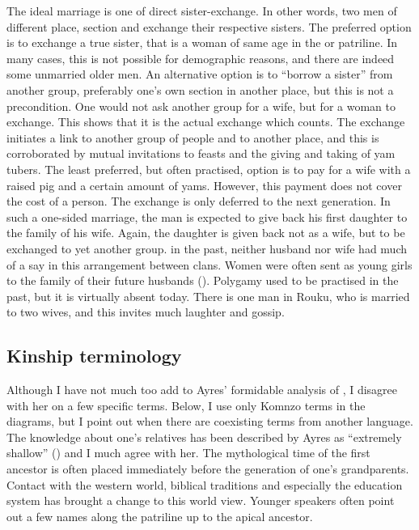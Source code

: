 The ideal marriage is one of direct sister-exchange. In other words, two men of different place, section and  exchange their respective sisters. The preferred option is to exchange a true sister, that is a woman of same age in the  or patriline. In many cases, this is not possible for demographic reasons, and there are indeed some unmarried older men. An alternative option is to ``borrow a sister'' from another group, preferably one's own section in another place, but this is not a precondition. One would not ask another group for a wife, but for a woman to exchange. This shows that it is the actual exchange which counts. The exchange initiates a link to another group of people and to another place, and this is corroborated by mutual invitations to feasts and the giving and taking of yam tubers. The least preferred, but often practised, option is to pay for a wife with a raised pig and a certain amount of yams. However, this payment does not cover the cost of a person. The exchange is only deferred to the next generation. In such a one-sided marriage, the man is expected to give back his first daughter to the family of his wife. Again, the daughter is given back not as a wife, but to be exchanged to yet another group. in the past, neither husband nor wife had much of a say in this arrangement between clans. Women were often sent as young girls to the family of their future husbands (\citealt[145]{Williams:1936transfly}). Polygamy used to be practised in the past, but it is virtually absent today. There is one man in Rouku, who is married to two wives, and this invites much laughter and gossip.

\subsection{Kinship terminology}\label{kinterms}

Although I have not much too add to Ayres' formidable analysis of , I disagree with her on a few specific terms. Below, I use only Komnzo terms in the  diagrams, but I point out when there are coexisting terms from another language. The knowledge about one's relatives has been described by Ayres as ``extremely shallow'' (\citeyear[217]{Ayres:ws}) and I much agree with her. The mythological time of the first ancestor is often placed immediately before the generation of one's grandparents. Contact with the western world, biblical traditions and especially the education system has brought a change to this world view. Younger speakers often point out a few names along the patriline up to the apical ancestor.


